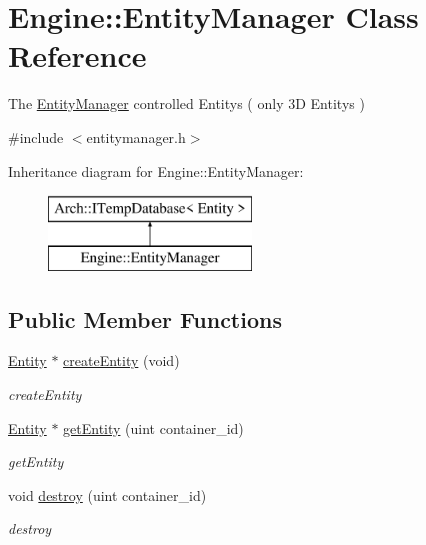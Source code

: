 \hypertarget{classEngine_1_1EntityManager}{}\section{Engine\+:\+:Entity\+Manager Class Reference}
\label{classEngine_1_1EntityManager}


The \hyperlink{classEngine_1_1EntityManager}{Entity\+Manager} controlled Entitys ( only 3\+D Entitys )  




{\ttfamily \#include $<$entitymanager.\+h$>$}

Inheritance diagram for Engine\+:\+:Entity\+Manager\+:\begin{figure}[H]
\begin{center}
\leavevmode
\includegraphics[height=2.000000cm]{classEngine_1_1EntityManager}
\end{center}
\end{figure}
\subsection*{Public Member Functions}
\begin{DoxyCompactItemize}
\item 
\hyperlink{classEngine_1_1Entity}{Entity} $\ast$ \hyperlink{classEngine_1_1EntityManager_aaa426b2acc175d41bb4845e09012c45d}{create\+Entity} (void)
\begin{DoxyCompactList}\small\item\em create\+Entity \end{DoxyCompactList}\item 
\hyperlink{classEngine_1_1Entity}{Entity} $\ast$ \hyperlink{classEngine_1_1EntityManager_a5941c75f3772e78bc2ebb052787b9db4}{get\+Entity} (uint container\+\_\+id)
\begin{DoxyCompactList}\small\item\em get\+Entity \end{DoxyCompactList}\item 
void \hyperlink{classEngine_1_1EntityManager_acc5cdfa18e05d93f0e5c96449383f7fd}{destroy} (uint container\+\_\+id)
\begin{DoxyCompactList}\small\item\em destroy \end{DoxyCompactList}\end{DoxyCompactItemize}


